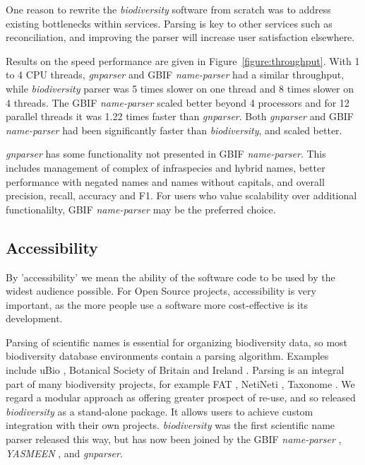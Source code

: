 \documentclass{bmcart}
\begin{document}
One reason to rewrite the \textit{biodiversity} software from scratch was to
address existing bottlenecks within services. Parsing is key to other services
such as reconciliation, and improving the parser will increase user
satisfaction elsewhere.

Results on the speed performance are given in Figure~\ref{figure:throughput}.
With 1 to 4 CPU threads, \textit{gnparser} and GBIF \textit{name-parser} had a
similar throughput, while \textit{biodiversity} parser was 5 times slower on
one thread and  8 times slower on 4 threads. The GBIF \textit{name-parser}
scaled better beyond 4 processors and for 12 parallel threads it was 1.22 times
faster than \textit{gnparser}.  Both \textit{gnparser} and GBIF
\textit{name-parser} had been significantly faster than \textit{biodiversity},
and scaled better.

\textit{gnparser} has some functionality not presented in GBIF
\textit{name-parser}. This includes management of complex of infraspecies and
hybrid names, better performance with negated names and names without capitals,
and overall precision, recall, accuracy and F1.  For users who value
scalability over additional functionalilty, GBIF \textit{name-parser} may be
the preferred choice.

\subsection*{Accessibility}

By 'accessibility' we mean the ability of the software code to be used by the widest
audience possible. For Open Source projects, accessibility is very important,
as the more people use a software more cost-effective is its development.

Parsing of scientific names is essential for organizing biodiversity data, so
most biodiversity database environments contain a parsing algorithm.  Examples
include  uBio \cite{ubio:parser}, Botanical Society of Britain and Ireland
\cite{botsociety:parser}.  Parsing is an integral part of many biodiversity
projects, for example FAT \cite{Sautter2006}, NetiNeti \cite{Akella2012},
Taxonome \cite{Kluyver2013}. We regard a modular approach as offering greater
prospect of re-use, and so  released \textit{biodiversity} \cite{Boyle2013} as
a stand-alone package.  It allows users to achieve custom integration  with
their own projects.  \textit{biodiversity} was the first scientific name parser
released this way, but has now been joined by the GBIF \textit{name-parser}
\cite{gbifNameParser}, \textit{YASMEEN} \cite{VandenBerghe2015}, and
\textit{gnparser}.
\end{document}
